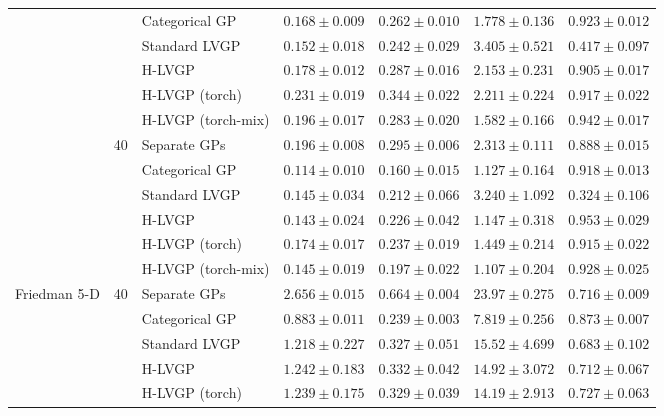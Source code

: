\begin{table}[htbp]
\begin{tabular}{lllrrrr}
 &  & Categorical GP & $0.168 \pm 0.009$ & $0.262 \pm 0.010$ & $1.778 \pm 0.136$ & $0.923 \pm 0.012$ \\
 &  & Standard LVGP & \colorbox{green!20}{\boldmath$0.152 \pm 0.018$} & \colorbox{green!20}{\boldmath$0.242 \pm 0.029$} & $3.405 \pm 0.521$ & $0.417 \pm 0.097$ \\
 &  & H-LVGP & $0.178 \pm 0.012$ & $0.287 \pm 0.016$ & $2.153 \pm 0.231$ & $0.905 \pm 0.017$ \\
 &  & H-LVGP (torch) & $0.231 \pm 0.019$ & $0.344 \pm 0.022$ & $2.211 \pm 0.224$ & $0.917 \pm 0.022$ \\
 &  & H-LVGP (torch-mix) & $0.196 \pm 0.017$ & $0.283 \pm 0.020$ & \colorbox{green!20}{\boldmath$1.582 \pm 0.166$} & $0.942 \pm 0.017$ \\
\cmidrule(lr){2-7}
 & \multirow{6}{*}{40} & Separate GPs & $0.196 \pm 0.008$ & $0.295 \pm 0.006$ & $2.313 \pm 0.111$ & $0.888 \pm 0.015$ \\
 &  & Categorical GP & \colorbox{green!20}{\boldmath$0.114 \pm 0.010$} & \colorbox{green!20}{\boldmath$0.160 \pm 0.015$} & $1.127 \pm 0.164$ & $0.918 \pm 0.013$ \\
 &  & Standard LVGP & $0.145 \pm 0.034$ & $0.212 \pm 0.066$ & $3.240 \pm 1.092$ & $0.324 \pm 0.106$ \\
 &  & H-LVGP & $0.143 \pm 0.024$ & $0.226 \pm 0.042$ & $1.147 \pm 0.318$ & \colorbox{green!20}{\boldmath$0.953 \pm 0.029$} \\
 &  & H-LVGP (torch) & $0.174 \pm 0.017$ & $0.237 \pm 0.019$ & $1.449 \pm 0.214$ & $0.915 \pm 0.022$ \\
 &  & H-LVGP (torch-mix) & $0.145 \pm 0.019$ & $0.197 \pm 0.022$ & \colorbox{green!20}{\boldmath$1.107 \pm 0.204$} & $0.928 \pm 0.025$ \\
\midrule
\multirow{18}{*}{Friedman 5-D} & \multirow{6}{*}{40} & Separate GPs & $2.656 \pm 0.015$ & $0.664 \pm 0.004$ & $23.97 \pm 0.275$ & $0.716 \pm 0.009$ \\
 &  & Categorical GP & $0.883 \pm 0.011$ & $0.239 \pm 0.003$ & $7.819 \pm 0.256$ & \colorbox{green!20}{\boldmath$0.873 \pm 0.007$} \\
 &  & Standard LVGP & $1.218 \pm 0.227$ & $0.327 \pm 0.051$ & $15.52 \pm 4.699$ & $0.683 \pm 0.102$ \\
 &  & H-LVGP & $1.242 \pm 0.183$ & $0.332 \pm 0.042$ & $14.92 \pm 3.072$ & $0.712 \pm 0.067$ \\
 &  & H-LVGP (torch) & $1.239 \pm 0.175$ & $0.329 \pm 0.039$ & $14.19 \pm 2.913$ & $0.727 \pm 0.063$ \\

\end{tabular}
\end{table}

